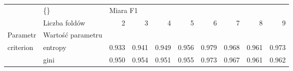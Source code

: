 \begin{tabular}{llrrrrrrrr}
\hline
          & \{\} & \multicolumn{8}{l}{Miara F1} \\
          & Liczba foldów &        2 &      3 &      4 &      5 &      6 &      7 &      8 &      9 \\
Parametr & Wartość parametru &          &        &        &        &        &        &        &        \\
\hline
criterion & entropy &    0.933 &  0.941 &  0.949 &  0.956 &  0.979 &  0.968 &  0.961 &  0.973 \\
          & gini &    0.950 &  0.954 &  0.951 &  0.955 &  0.973 &  0.967 &  0.961 &  0.962 \\
\hline
\end{tabular}
